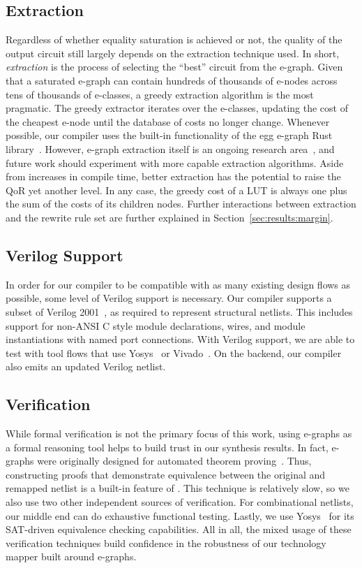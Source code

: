\subsection{Extraction}\label{sec:flow:extraction}
Regardless of whether equality saturation is achieved or not, the quality of
the output circuit still largely depends on the extraction technique used. In
short, \textit{extraction} is the process of selecting the ``best'' circuit
from the e-graph. Given that a saturated e-graph can contain hundreds of
thousands of e-nodes across tens of thousands of e-classes, a greedy extraction
algorithm is the most pragmatic. The greedy extractor iterates over the
e-classes, updating the cost of the cheapest e-node until the database of costs
no longer change. Whenever possible, our compiler uses the built-in
functionality of the egg e-graph Rust library~\cite{docsEgg}. However, e-graph
extraction itself is an ongoing research area~\cite{smoothe,
    sparsextract,esynth}, and future work should experiment with more capable
extraction algorithms. Aside from increases in compile time, better extraction
has the potential to raise the QoR yet another level. In any case, the greedy
cost of a LUT is always one plus the sum of the costs of its children nodes.
Further interactions between extraction and the rewrite rule set are further
explained in Section~\ref{sec:results:margin}.

\subsection{Verilog Support}\label{sec:flow:verilog}
In order for our compiler to be compatible with as many existing design flows
as possible, some level of Verilog support is necessary. Our compiler supports
a subset of Verilog 2001~\cite{verilog}, as required to represent structural
netlists. This includes support for non-ANSI C style module declarations,
wires, and module instantiations with named port connections. With Verilog
support, we are able to test \shortname{} with tool flows that use
Yosys~\cite{yosys} or Vivado~\cite{vivado}. On the backend, our compiler also
emits an updated Verilog netlist.

\subsection{Verification}\label{sec:flow:verification}
While formal verification is not the primary focus of this work, using e-graphs
as a formal reasoning tool helps to build trust in our synthesis results. In
fact, e-graphs were originally designed for automated theorem
proving~\cite{eggpaper}. Thus, constructing proofs that demonstrate equivalence
between the original and remapped netlist is a built-in feature of
\shortname{}. This technique is relatively slow, so we also use two other
independent sources of verification. For combinational netlists, our middle end
can do exhaustive functional testing. Lastly, we use Yosys~\cite{yosys} for its
SAT-driven equivalence checking capabilities. All in all, the mixed usage of
these verification techniques build confidence in the robustness of our
technology mapper built around e-graphs.